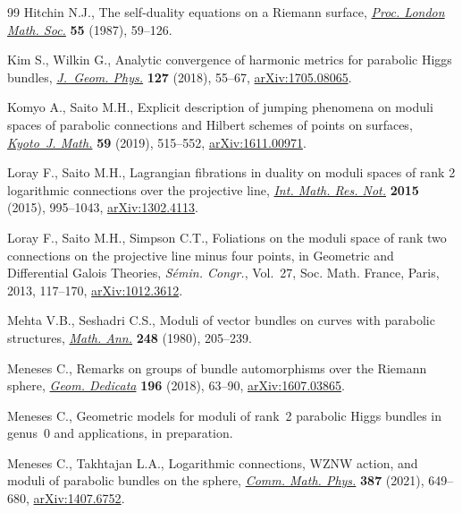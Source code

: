 \documentclass[10pt,a4paper]{amsart}
\numberwithin{equation}{section}
\begin{document}
\begin{thebibliography}{99}
Hitchin N.J., The self-duality equations on a {R}iemann surface, \href{https://doi.org/10.1112/plms/s3-55.1.59}{\textit{Proc.
 London Math. Soc.}} \textbf{55} (1987), 59--126.

Kim S., Wilkin G., Analytic convergence of harmonic metrics for parabolic
 {H}iggs bundles, \href{https://doi.org/10.1016/j.geomphys.2018.01.023}{\textit{J.~Geom. Phys.}} \textbf{127} (2018), 55--67,
 \href{https://arxiv.org/abs/1705.08065}{arXiv:1705.08065}.

Komyo A., Saito M.H., Explicit description of jumping phenomena on moduli
 spaces of parabolic connections and {H}ilbert schemes of points on surfaces,
 \href{https://doi.org/10.1215/21562261-2019-0016}{\textit{Kyoto~J. Math.}} \textbf{59} (2019), 515--552, \href{https://arxiv.org/abs/1611.00971}{arXiv:1611.00971}.

Loray F., Saito M.H., Lagrangian fibrations in duality on moduli spaces of rank
 2 logarithmic connections over the projective line, \href{https://doi.org/10.1093/imrn/rnt232}{\textit{Int. Math. Res.
 Not.}} \textbf{2015} (2015), 995--1043, \href{https://arxiv.org/abs/1302.4113}{arXiv:1302.4113}.

Loray F., Saito M.H., Simpson C.T., Foliations on the moduli space of rank two
 connections on the projective line minus four points, in Geometric and
 Differential {G}alois Theories, \textit{S\'emin. Congr.}, Vol.~27, Soc. Math.
 France, Paris, 2013, 117--170, \href{https://arxiv.org/abs/1012.3612}{arXiv:1012.3612}.

Mehta V.B., Seshadri C.S., Moduli of vector bundles on curves with parabolic
 structures, \href{https://doi.org/10.1007/BF01420526}{\textit{Math. Ann.}} \textbf{248} (1980), 205--239.

Meneses C., Remarks on groups of bundle automorphisms over the {R}iemann
 sphere, \href{https://doi.org/10.1007/s10711-017-0309-y}{\textit{Geom. Dedicata}} \textbf{196} (2018), 63--90,
 \href{https://arxiv.org/abs/1607.03865}{arXiv:1607.03865}.

Meneses C., Geometric models for moduli of rank~2 parabolic {H}iggs bundles in
 genus~0 and applications, {i}n preparation.

Meneses C., Takhtajan L.A., Logarithmic connections, {WZNW} action, and moduli
 of parabolic bundles on the sphere, \href{https://doi.org/10.1007/s00220-021-04183-y}{\textit{Comm. Math. Phys.}} \textbf{387}
 (2021), 649--680, \href{https://arxiv.org/abs/1407.6752}{arXiv:1407.6752}.


\end{thebibliography}
\end{document}

